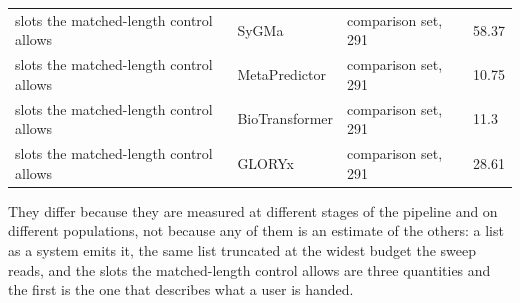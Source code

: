 \begin{table}[h]
\begin{threeparttable}
\begin{tabular}{llll}
slots the matched-length control allows & SyGMa & comparison set, 291 & 58.37 \\
slots the matched-length control allows & MetaPredictor & comparison set, 291 & 10.75 \\
slots the matched-length control allows & BioTransformer & comparison set, 291 & 11.3 \\
slots the matched-length control allows & GLORYx & comparison set, 291 & 28.61 \\
\bottomrule
\end{tabular}
\begin{tablenotes}[flushleft]\footnotesize
\item They differ because they are measured at different stages of the pipeline and on different populations, not because any of them is an estimate of the others: a list as a system emits it, the same list truncated at the widest budget the sweep reads, and the slots the matched-length control allows are three quantities and the first is the one that describes what a user is handed.
\end{tablenotes}
\end{threeparttable}
\end{table}
